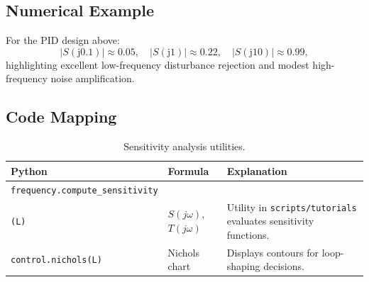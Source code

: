 \subsection{Numerical Example}
For the PID design above:
\[
    |S(\mathrm{j}0.1)| \approx 0.05,\quad |S(\mathrm{j}1)| \approx 0.22,\quad |S(\mathrm{j}10)| \approx 0.99,
\]
highlighting excellent low-frequency disturbance rejection and modest high-frequency noise amplification.

\subsection{Code Mapping}
\begin{table}[h]
    \centering
    \small
    \renewcommand{\arraystretch}{1.2}
    \begin{tabularx}{\linewidth}{|>{\raggedright\arraybackslash}p{4cm}|X|X|}
        \hline
        \textbf{Python} & \textbf{Formula} & \textbf{Explanation} \\
        \hline
        \texttt{frequency.compute\_sensitivity}\\\texttt{(L)} & $S(j\omega)$, $T(j\omega)$ & Utility in \texttt{scripts/tutorials} evaluates sensitivity functions. \\
        \hline
        \texttt{control.nichols(L)} & Nichols chart & Displays contours for loop-shaping decisions. \\
        \hline
    \end{tabularx}
    \caption{Sensitivity analysis utilities.}
\end{table}

